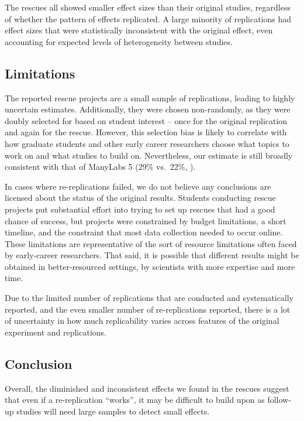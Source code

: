 \documentclass[
  english,
  a4paper,
]{article}
\begin{document}
The rescues all showed smaller effect sizes than their original studies, regardless of whether the pattern of effects replicated.
A large minority of replications had effect sizes that were statistically inconsistent with the original effect, even accounting for expected levels of heterogeneity between studies.

\subsection{Limitations}\label{limitations}

The reported rescue projects are a small sample of replications, leading to highly uncertain estimates.
Additionally, they were chosen non-randomly, as they were doubly selected for based on student interest -- once for the original replication and again for the rescue.
However, this selection bias is likely to correlate with how graduate students and other early career researchers choose what topics to work on and what studies to build on.
Nevertheless, our estimate is still broadly consistent with that of ManyLabs 5 (29\% vs.~22\%, ).

In cases where re-replications failed, we do not believe any conclusions are licensed about the status of the original results.
Students conducting rescue projects put substantial effort into trying to set up rescues that had a good chance of success, but projects were constrained by budget limitations, a short timeline, and the constraint that most data collection needed to occur online.
These limitations are representative of the sort of resource limitations often faced by early-career researchers.
That said, it is possible that different results might be obtained in better-resourced settings, by scientists with more expertise and more time.

Due to the limited number of replications that are conducted and systematically reported, and the even smaller number of re-replications reported, there is a lot of uncertainty in how much replicability varies across features of the original experiment and replications.

\subsection{Conclusion}\label{conclusion}

Overall, the diminished and inconsistent effects we found in the rescues suggest that even if a re-replication ``works'', it may be difficult to build upon as follow-up studies will need large samples to detect small effects.
\end{document}
